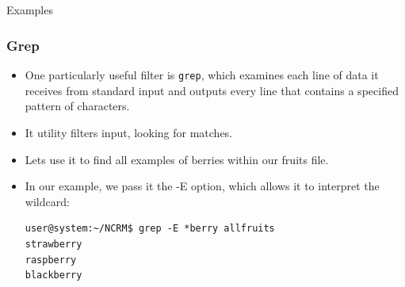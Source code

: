 \documentclass[10pt]{beamer}
\begin{document}
\subsection{}
\begin{frame}[fragile]{Examples}
\frametitle{Grep}
\begin{itemize} 
\item One particularly useful filter is \texttt{grep}, which examines each line of data it receives from standard input and outputs every line that contains a specified pattern of characters.\vspace{0.05in}
\item It utility filters input, looking for matches.\vspace{0.05in}
\item Lets use it to find all examples of berries within our fruits file.\vspace{0.05in}
\item In our example, we pass it the -E option, which allows it to interpret the wildcard:\vspace{0.05in}
\begin{lstlisting}[style=BashInputStyle, title=The \texttt{grep} Command]
user@system:~/NCRM$ grep -E *berry allfruits
strawberry
raspberry
blackberry
\end{lstlisting}
\end{itemize}
\end{frame}
\end{document}
